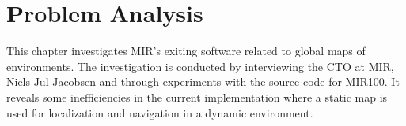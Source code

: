 \chapter{Problem Analysis}
This chapter investigates MIR’s exiting software related to global maps of environments. The investigation is conducted by interviewing the CTO at MIR, Niels Jul Jacobsen and through experiments with the source code for MIR100. It reveals some inefficiencies in the current implementation where a static map is used for localization and navigation in a dynamic environment.











